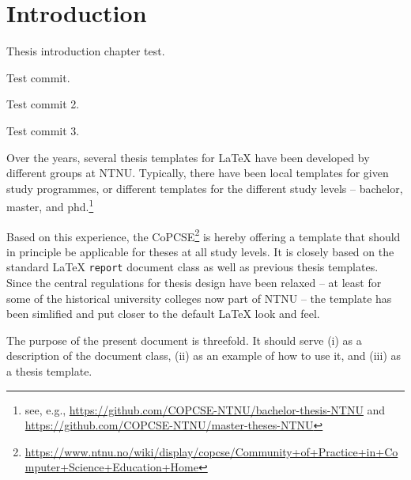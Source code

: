 \chapter{Introduction}

Thesis introduction chapter test.

Test commit.

Test commit 2.

Test commit 3.

Over the years, several thesis templates for \LaTeX{} have been developed by different groups at NTNU\@. Typically, there have been local templates for given study programmes, or different templates for the different study levels – bachelor, master, and \acrshort{phd}.\footnote{see, e.g., \url{https://github.com/COPCSE-NTNU/bachelor-thesis-NTNU} and \url{https://github.com/COPCSE-NTNU/master-theses-NTNU}}

Based on this experience, the \acrfull{CoPCSE}\footnote{\url{https://www.ntnu.no/wiki/display/copcse/Community+of+Practice+in+Computer+Science+Education+Home}} is hereby offering a template that should in principle be applicable for theses at all study levels. It is closely based on the standard \LaTeX{} \texttt{report} document class as well as previous thesis templates. Since the central regulations for thesis design have been relaxed – at least for some of the historical university colleges now part of NTNU – the template has been simlified and put closer to the default \LaTeX{} look and feel.

The purpose of the present document is threefold. It should serve (i) as a description of the document class, (ii) as an example of how to use it, and (iii) as a thesis template.
